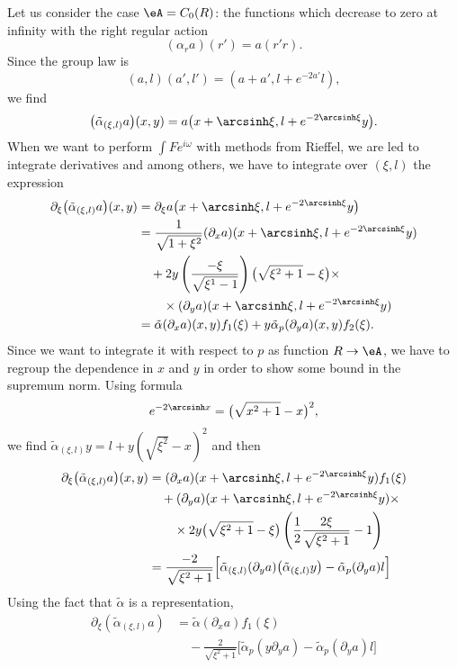 Let us consider the case $\eA=C_0(R)$: the functions which decrease to zero at infinity with the right regular action
\[ 
  (\alpha_ra)(r')=a(r'r).
\]
Since the group law is 
\[ 
  (a,l)(a',l')=(a+a',l+e^{-2a'}l),
\]
we find
\begin{equation}
\big( \tilde\alpha_{(\xi,l)}a \big)(x,y)=a\big( x+\arcsinh\xi,l+e^{-2\arcsinh\xi}y \big).
\end{equation}
When we want to perform $\int Fe^{i\omega}$ with methods from Rieffel, we are led to integrate derivatives and among others, we have to integrate over $(\xi,l)$ the expression 
\begin{equation}
\begin{split}
\partial_{\xi}\big(\tilde\alpha_{(\xi,l)}a\big)(x,y)&=\partial_{\xi}a\big( x+\arcsinh\xi,l+e^{-2\arcsinh\xi}y \big)\\
		&=\frac{1}{ \sqrt{1+\xi^2} }(\partial_xa)( x+\arcsinh\xi,l+e^{-2\arcsinh\xi}y )\\
		&\quad +2y\left( \frac{ -\xi }{ \sqrt{\xi^1-1} } \right)\big(\sqrt{\xi^2+1}-\xi\big)\times\\
		&\qquad\times(\partial_ya)( x+\arcsinh\xi,l+e^{-2\arcsinh\xi}y )\\
		&=\tilde\alpha(\partial_xa)(x,y)f_1(\xi)+y\tilde\alpha_p(\partial_ya)(x,y)f_2(\xi).
\end{split}
\end{equation}
Since we want to integrate it with respect to $p$ as function $R\to \eA$, we have to regroup the dependence in $x$ and $y$ in order to show some bound in the supremum norm. Using formula
\[ 
  e^{-2\arcsinh x}=\big( \sqrt{x^2+1}-x \big)^2,
\]
we find $\tilde\alpha_{(\xi,l)}y=l+y(\sqrt{\xi^2}-x)^2$ and then
\begin{subequations}
\begin{align}
\partial_{\xi}\big( \tilde\alpha_{(\xi,l)}a \big)(x,y)&=(\partial_xa)( x+\arcsinh\xi,l+e^{-2\arcsinh\xi}y )f_1(\xi)\\
	&\quad+( \partial_ya)(x+\arcsinh\xi,l+e^{-2\arcsinh\xi}y)\times\\
	&\qquad\times 2y\big( \sqrt{\xi^2+1}-\xi \big)\left( \frac{ 1 }{2}\frac{ 2\xi }{ \sqrt{\xi^2+1} }-1 \right)\\
	&=\frac{ -2 }{ \sqrt{\xi^2+1} }\Big[  \tilde\alpha_{(\xi,l)}(\partial_ya)\big( \tilde\alpha_{(\xi,l)}y\big)-\tilde\alpha_p(\partial_ya) l  \Big]
\end{align}
\end{subequations}
Using the fact that $\tilde\alpha$ is a representation,
\[ 
\begin{split}
\partial_{\xi}(\tilde\alpha_{(\xi,l)}a)&=\tilde\alpha(\partial_xa)f_1(\xi)\\
		&\quad -\frac{ 2 }{ \sqrt{\xi^2+1} }\Big[ \tilde\alpha_p(y\partial_ya)-\tilde\alpha_p(\partial_ya)l\Big]
  \end{split}
\]
